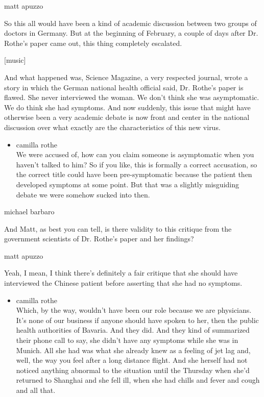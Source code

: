 matt apuzzo

So this all would have been a kind of academic discussion between two
groups of doctors in Germany. But at the beginning of February, a couple
of days after Dr. Rothe's paper came out, this thing completely
escalated.

{[}music{]}

And what happened was, Science Magazine, a very respected journal, wrote
a story in which the German national health official said, Dr. Rothe's
paper is flawed. She never interviewed the woman. We don't think she was
asymptomatic. We do think she had symptoms. And now suddenly, this issue
that might have otherwise been a very academic debate is now front and
center in the national discussion over what exactly are the
characteristics of this new virus.

\begin{itemize}
\tightlist
\item
  camilla rothe\\
  We were accused of, how can you claim someone is asymptomatic when you
  haven't talked to him? So if you like, this is formally a correct
  accusation, so the correct title could have been pre-symptomatic
  because the patient then developed symptoms at some point. But that
  was a slightly misguiding debate we were somehow sucked into then.
\end{itemize}

michael barbaro

And Matt, as best you can tell, is there validity to this critique from
the government scientists of Dr. Rothe's paper and her findings?

matt apuzzo

Yeah, I mean, I think there's definitely a fair critique that she should
have interviewed the Chinese patient before asserting that she had no
symptoms.

\begin{itemize}
\tightlist
\item
  camilla rothe\\
  Which, by the way, wouldn't have been our role because we are
  physicians. It's none of our business if anyone should have spoken to
  her, then the public health authorities of Bavaria. And they did. And
  they kind of summarized their phone call to say, she didn't have any
  symptoms while she was in Munich. All she had was what she already
  knew as a feeling of jet lag and, well, the way you feel after a long
  distance flight. And she herself had not noticed anything abnormal to
  the situation until the Thursday when she'd returned to Shanghai and
  she fell ill, when she had chills and fever and cough and all that.
\end{itemize}

